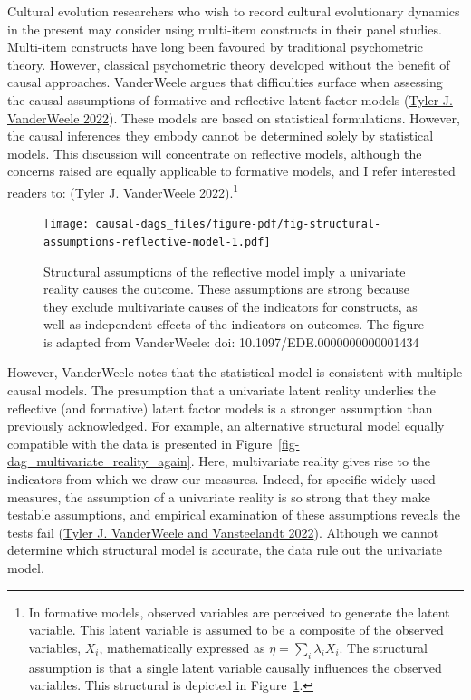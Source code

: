 \documentclass[
  singlecolumn]{report}
\begin{document}
Cultural evolution researchers who wish to record cultural evolutionary
dynamics in the present may consider using multi-item constructs in
their panel studies. Multi-item constructs have long been favoured by
traditional psychometric theory. However, classical psychometric theory
developed without the benefit of causal approaches. VanderWeele argues
that difficulties surface when assessing the causal assumptions of
formative and reflective latent factor models
(\protect\hyperlink{ref-vanderweele2022}{Tyler J. VanderWeele 2022}).
These models are based on statistical formulations. However, the causal
inferences they embody cannot be determined solely by statistical
models. This discussion will concentrate on reflective models, although
the concerns raised are equally applicable to formative models, and I
refer interested readers to:
(\protect\hyperlink{ref-vanderweele2022}{Tyler J. VanderWeele
2022}).\footnote{In formative models, observed variables are perceived
  to generate the latent variable. This latent variable is assumed to be
  a composite of the observed variables, \(X_i\), mathematically
  expressed as \(\eta = \sum_i\lambda_i X_i\). The structural assumption
  is that a single latent variable causally influences the observed
  variables. This structural is depicted in
  Figure~\ref{fig-structural-assumptions-reflective-model}.}

\begin{figure}

{\centering \texttt{[image: causal-dags\_files/figure-pdf/fig-structural-assumptions-reflective-model-1.pdf]}

}

\caption{\label{fig-structural-assumptions-reflective-model}Structural
assumptions of the reflective model imply a univariate reality causes
the outcome. These assumptions are strong because they exclude
multivariate causes of the indicators for constructs, as well as
independent effects of the indicators on outcomes. The figure is adapted
from VanderWeele: doi: 10.1097/EDE.0000000000001434}

\end{figure}

However, VanderWeele notes that the statistical model is consistent with
multiple causal models. The presumption that a univariate latent reality
underlies the reflective (and formative) latent factor models is a
stronger assumption than previously acknowledged. For example, an
alternative structural model equally compatible with the data is
presented in Figure~\ref{fig-dag_multivariate_reality_again}. Here,
multivariate reality gives rise to the indicators from which we draw our
measures. Indeed, for specific widely used measures, the assumption of a
univariate reality is so strong that they make testable assumptions, and
empirical examination of these assumptions reveals the tests fail
(\protect\hyperlink{ref-vanderweele2022d}{Tyler J. VanderWeele and
Vansteelandt 2022}). Although we cannot determine which structural model
is accurate, the data rule out the univariate model.
\end{document}
